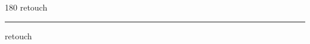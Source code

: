 
\begin{frame}
\begin{center}
\begin{turn}{180}
{\fontsize{2.5cm}{1em}\selectfont retouch}
\end{turn}
\vspace{1em}\par  
\hrule
\vspace{1em}\par  
{\fontsize{2.5cm}{1em}\selectfont retouch}
\end{center}
\end{frame}

